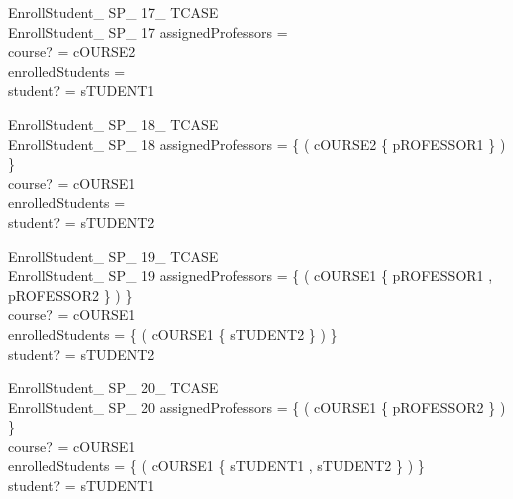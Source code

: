 \documentclass{article}
\begin{document}
\begin{schema}{EnrollStudent\_ SP\_ 17\_ TCASE}\\
 EnrollStudent\_ SP\_ 17 
\where
 assignedProfessors =~\emptyset \\
 course? = cOURSE2 \\
 enrolledStudents =~\emptyset \\
 student? = sTUDENT1
\end{schema}


\begin{schema}{EnrollStudent\_ SP\_ 18\_ TCASE}\\
 EnrollStudent\_ SP\_ 18 
\where
 assignedProfessors = \{ ( cOURSE2 \mapsto \{ pROFESSOR1 \} ) \} \\
 course? = cOURSE1 \\
 enrolledStudents =~\emptyset \\
 student? = sTUDENT2
\end{schema}


\begin{schema}{EnrollStudent\_ SP\_ 19\_ TCASE}\\
 EnrollStudent\_ SP\_ 19 
\where
 assignedProfessors = \{ ( cOURSE1 \mapsto \{ pROFESSOR1 , pROFESSOR2 \} ) \} \\
 course? = cOURSE1 \\
 enrolledStudents = \{ ( cOURSE1 \mapsto \{ sTUDENT2 \} ) \} \\
 student? = sTUDENT2
\end{schema}


\begin{schema}{EnrollStudent\_ SP\_ 20\_ TCASE}\\
 EnrollStudent\_ SP\_ 20 
\where
 assignedProfessors = \{ ( cOURSE1 \mapsto \{ pROFESSOR2 \} ) \} \\
 course? = cOURSE1 \\
 enrolledStudents = \{ ( cOURSE1 \mapsto \{ sTUDENT1 , sTUDENT2 \} ) \} \\
 student? = sTUDENT1
\end{schema}
\end{document}
